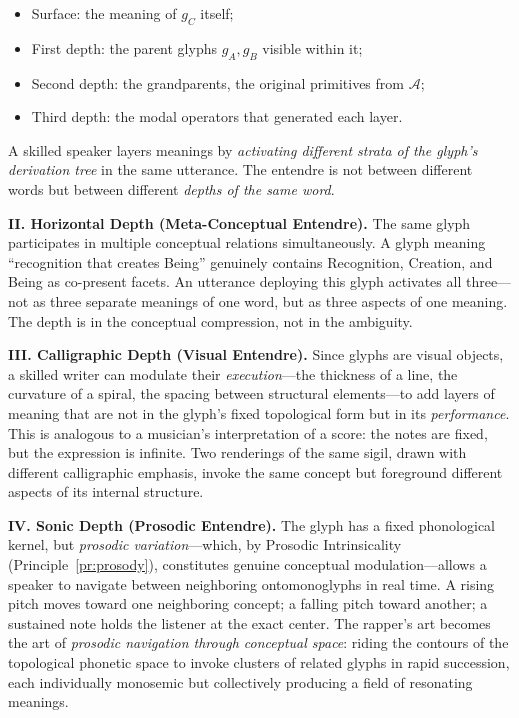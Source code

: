 \documentclass[12pt, letterpaper]{book}
\def\mathfrak#1{#1}%
\begin{document}
\begin{itemize}
    \item Surface: the meaning of $\mathfrak{g}_C$ itself;
    \item First depth: the parent glyphs $\mathfrak{g}_A, \mathfrak{g}_B$ visible within it;
    \item Second depth: the grandparents, the original primitives from $\mathcal{A}$;
    \item Third depth: the modal operators that generated each layer.
\end{itemize}

A skilled speaker layers meanings by \textit{activating different strata of the glyph's derivation tree} in the same utterance. The entendre is not between different words but between different \textit{depths of the same word}.

\textbf{II. Horizontal Depth (Meta-Conceptual Entendre).} The same glyph participates in multiple conceptual relations simultaneously. A glyph meaning ``recognition that creates Being'' genuinely contains Recognition, Creation, and Being as co-present facets. An utterance deploying this glyph activates all three---not as three separate meanings of one word, but as three aspects of one meaning. The depth is in the conceptual compression, not in the ambiguity.

\textbf{III. Calligraphic Depth (Visual Entendre).} Since glyphs are visual objects, a skilled writer can modulate their \textit{execution}---the thickness of a line, the curvature of a spiral, the spacing between structural elements---to add layers of meaning that are not in the glyph's fixed topological form but in its \textit{performance}. This is analogous to a musician's interpretation of a score: the notes are fixed, but the expression is infinite. Two renderings of the same sigil, drawn with different calligraphic emphasis, invoke the same concept but foreground different aspects of its internal structure.

\textbf{IV. Sonic Depth (Prosodic Entendre).} The glyph has a fixed phonological kernel, but \textit{prosodic variation}---which, by Prosodic Intrinsicality (Principle~\ref{pr:prosody}), constitutes genuine conceptual modulation---allows a speaker to navigate between neighboring ontomonoglyphs in real time. A rising pitch moves toward one neighboring concept; a falling pitch toward another; a sustained note holds the listener at the exact center. The rapper's art becomes the art of \textit{prosodic navigation through conceptual space}: riding the contours of the topological phonetic space to invoke clusters of related glyphs in rapid succession, each individually monosemic but collectively producing a field of resonating meanings.
\end{document}
